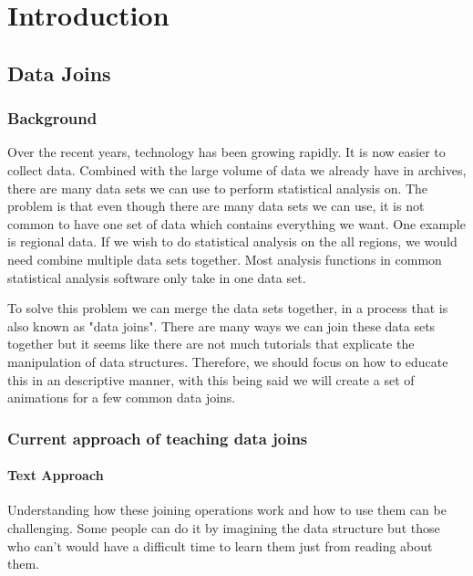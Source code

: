 
\chapter{Introduction} %

\label{Introduction} %

\section{Data Joins}
\subsection{Background}
Over the recent years, technology has been growing rapidly. It is now easier to collect data. Combined with the large volume of data we already have in archives, there are many data sets we can use to perform statistical analysis on. The problem is that even though there are many data sets we can use, it is not common to have one set of data which contains everything we want. One example is regional data. If we wish to do statistical analysis on the all regions, we would need combine multiple data sets together. Most analysis functions in common statistical analysis software only take in one data set.

To solve this problem we can merge the data sets together, in a process that is also known as "data joins". There are many ways we can join these data sets together but it seems like there are not much tutorials that explicate the manipulation of data structures.
Therefore, we should focus on how to educate this in an descriptive manner, with this being said we will create a set of animations for a few common data joins. 

\subsection{Current approach of teaching data joins}
\subsubsection{Text Approach}
Understanding how these joining operations work and how to use them can be challenging. Some people can do it by imagining the data structure but those who can’t would have a difficult time to learn them just from reading about them.

